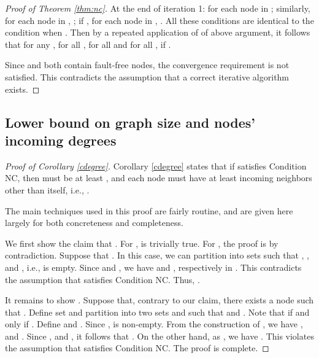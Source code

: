 \documentclass[letterpaper, 11pt]{article}
\begin{document}
\begin{proof}[Proof of Theorem \ref{thm:nc}]
At the end of iteration 1: for each node  in  ; similarly, for each node  in , ; if , for each node  in , . All these conditions are identical to the condition when . Then by a repeated application of of above argument, it follows that for any ,  for all ,  for all  and  for all , if .

Since  and  both contain fault-free nodes, the convergence requirement is not satisfied. This contradicts the assumption that a correct iterative algorithm exists.
\end{proof}

\subsection{Lower bound on graph size and nodes' incoming degrees} \label{app:cdegree}

\begin{proof}[Proof of Corollary \ref{cdegree}]
Corollary \ref{cdegree} states that if  satisfies Condition NC, then
  must be at least , and each node must have at least  incoming neighbors other than itself, i.e., .


The main
techniques used in this proof are fairly routine, and are given here
largely for both concreteness and completeness.

We first show the claim that .
For ,  is trivially true. For , the proof is by contradiction. Suppose that . In this case, we can partition  into sets  such that , ,  and , i.e.,  is empty. Since  and , we have  and , respectively in . This contradicts the assumption that  satisfies Condition NC. Thus, .

It remains to show .
Suppose that, contrary to our claim, there exists a node  such that .
Define set  and partition  into two sets  and 
such that 
and . Note that  if and only if .
Define  and . Since ,  is non-empty. From the construction of , we have , and .
Since ,  and , it follows that .
On the other hand, as , we have . This violates the assumption that  satisfies Condition NC. The proof is complete.
\end{proof}
\end{document}
